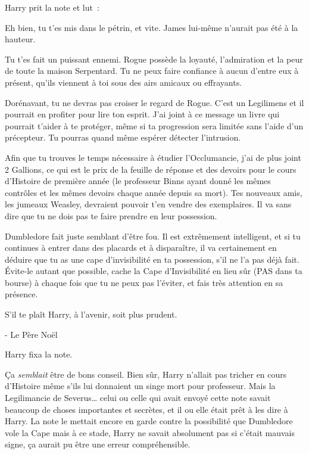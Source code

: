 Harry prit la note et lut~:


\begin{writtenNote}
Eh bien, tu t'es mis dans le pétrin, et vite. James lui-même n'aurait pas été à la hauteur.

Tu t'es fait un puissant ennemi. Rogue possède la loyauté, l'admiration et la peur de toute la maison Serpentard. Tu ne peux faire confiance à aucun d'entre eux à présent, qu'ils viennent à toi sous des airs amicaux ou effrayants.

Dorénavant, tu ne devras pas croiser le regard de Rogue. C'est un Legilimens et il pourrait en profiter pour lire ton esprit. J'ai joint à ce message un livre qui pourrait t'aider à te protéger, même si ta progression sera limitée sans l'aide d'un précepteur. Tu pourras quand même espérer détecter l'intrusion.

Afin que tu trouves le temps nécessaire à étudier l'Occlumancie, j'ai de plus joint 2 Gallions, ce qui est le prix de la feuille de réponse et des devoirs pour le cours d'Histoire de première année (le professeur Binns ayant donné les mêmes contrôles et les mêmes devoirs chaque année depuis sa mort). Tes nouveaux amis, les jumeaux Weasley, devraient pouvoir t'en vendre des exemplaires. Il va sans dire que tu ne dois pas te faire prendre en leur possession.

Dumbledore fait juste semblant d'être fou. Il est extrêmement intelligent, et si tu continues à entrer dans des placards et à disparaître, il va certainement en déduire que tu as une cape d'invisibilité en ta possession, s'il ne l'a pas déjà fait. Évite-le autant que possible, cache la Cape d'Invisibilité en lieu sûr (PAS dans ta bourse) à chaque fois que tu ne peux pas l'éviter, et fais très attention en sa présence.

S'il te plaît Harry, à l'avenir, soit plus prudent.

- Le Père Noël
\end{writtenNote}

Harry fixa la note.

Ça \emph{semblait} être de bons conseil. Bien sûr, Harry n'allait pas tricher en cours d'Histoire même s'ils lui donnaient un singe mort pour professeur. Mais la Legilimancie de Severus… celui ou celle qui avait envoyé cette note savait beaucoup de choses importantes et secrètes, et il ou elle était prêt à les dire à Harry. La note le mettait encore en garde contre la possibilité que Dumbledore vole la Cape mais à ce stade, Harry ne savait absolument pas si c'était mauvais signe, ça aurait pu être une erreur compréhensible.

